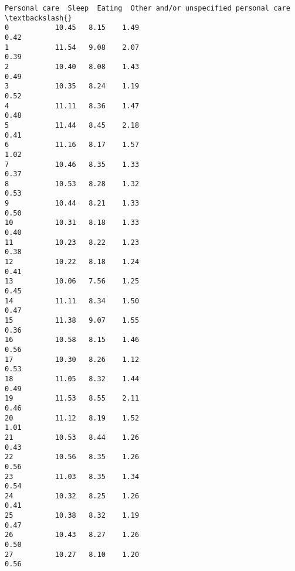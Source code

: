 \documentclass[11pt]{article}
\begin{document}
\begin{Verbatim}[commandchars=\\\{\}]
    Personal care  Sleep  Eating  Other and/or unspecified personal care  \textbackslash{}
0           10.45   8.15    1.49                                    0.42   
1           11.54   9.08    2.07                                    0.39   
2           10.40   8.08    1.43                                    0.49   
3           10.35   8.24    1.19                                    0.52   
4           11.11   8.36    1.47                                    0.48   
5           11.44   8.45    2.18                                    0.41   
6           11.16   8.17    1.57                                    1.02   
7           10.46   8.35    1.33                                    0.37   
8           10.53   8.28    1.32                                    0.53   
9           10.44   8.21    1.33                                    0.50   
10          10.31   8.18    1.33                                    0.40   
11          10.23   8.22    1.23                                    0.38   
12          10.22   8.18    1.24                                    0.41   
13          10.06   7.56    1.25                                    0.45   
14          11.11   8.34    1.50                                    0.47   
15          11.38   9.07    1.55                                    0.36   
16          10.58   8.15    1.46                                    0.56   
17          10.30   8.26    1.12                                    0.53   
18          11.05   8.32    1.44                                    0.49   
19          11.53   8.55    2.11                                    0.46   
20          11.12   8.19    1.52                                    1.01   
21          10.53   8.44    1.26                                    0.43   
22          10.56   8.35    1.26                                    0.56   
23          11.03   8.35    1.34                                    0.54   
24          10.32   8.25    1.26                                    0.41   
25          10.38   8.32    1.19                                    0.47   
26          10.43   8.27    1.26                                    0.50   
27          10.27   8.10    1.20                                    0.56   


\end{Verbatim}
\end{document}
